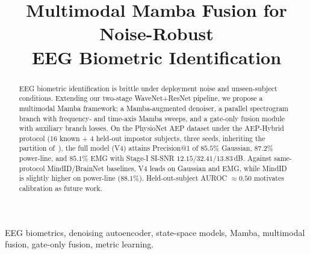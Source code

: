 \documentclass[conference,a4paper]{APSIPA2026}
\begin{document}
\title{Multimodal Mamba Fusion for Noise-Robust\\
EEG Biometric Identification}

\author{

}

\maketitle
\thispagestyle{firststyle}
\pagestyle{empty}

\begin{abstract}
EEG biometric identification is brittle under deployment noise and
unseen-subject conditions. Extending our two-stage WaveNet+ResNet
pipeline, we propose a multimodal Mamba framework: a Mamba-augmented
denoiser, a parallel spectrogram branch with frequency- and time-axis
Mamba sweeps, and a gate-only fusion module with auxiliary
branch losses. On the PhysioNet AEP dataset under the AEP-Hybrid
protocol (16 known + 4 held-out impostor subjects, three seeds,
inheriting the partition of~\cite{vu2026aisei}), the full model (V4)
attains Precision@1 of $85.5\%$ Gaussian, $87.2\%$ power-line, and
$85.1\%$ EMG with Stage-I SI-SNR $12.15$/$32.41$/$13.83$\,dB. Against
same-protocol MindID/BrainNet baselines, V4 leads on Gaussian and EMG,
while MindID is slightly higher on power-line ($88.1\%$).
Held-out-subject AUROC $\approx 0.50$ motivates calibration as future work.
\end{abstract}

\begin{IEEEkeywords}
EEG biometrics, denoising autoencoder, state-space models, Mamba,
multimodal fusion, gate-only fusion, metric learning.
\end{IEEEkeywords}
\end{document}
